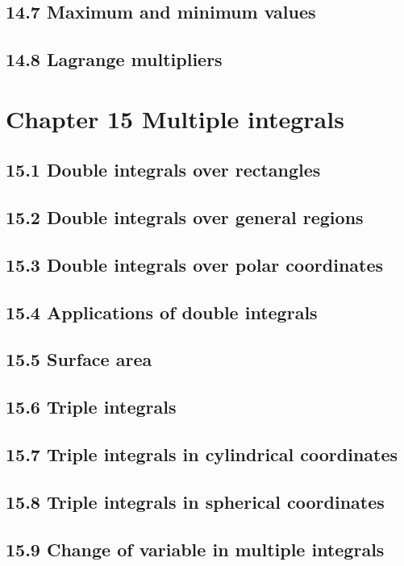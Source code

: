 \documentclass{article}
\begin{document}
\subsection{14.7 Maximum and minimum values}
\subsection{14.8 Lagrange multipliers}

\section{Chapter 15 Multiple integrals}
\subsection{15.1 Double integrals over rectangles}
\subsection{15.2 Double integrals over general regions}
\subsection{15.3 Double integrals over polar coordinates}
\subsection{15.4 Applications of double integrals}
\subsection{15.5 Surface area}
\subsection{15.6 Triple integrals}
\subsection{15.7 Triple integrals in cylindrical coordinates}
\subsection{15.8 Triple integrals in spherical coordinates}
\subsection{15.9 Change of variable in multiple integrals}
\end{document}
